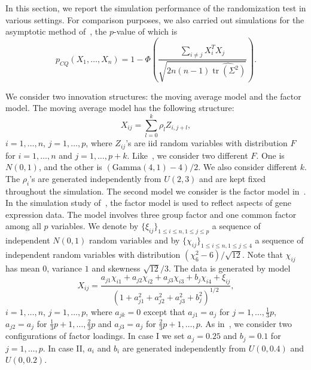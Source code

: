 \documentclass[3p]{elsarticle}
\DeclareMathOperator{\mytr}{tr}
\theoremstyle{plain}
\theoremstyle{definition}
\theoremstyle{remark}
\begin{document}
In this section, we report the simulation performance of the randomization test in various settings.
For comparison purposes, we also carried out simulations for the asymptotic method of~\citet{Chen2010A},
the $p$-value of which is
\begin{equation*}
p_{CQ}(X_1,\ldots,X_n)=1-\Phi\left(\frac{\sum_{i\neq j}X_i^T X_j}{\sqrt{2n(n-1)\widehat{\mytr(\Sigma^2)}}}\right).
\end{equation*}

We consider two innovation structures: the moving average model and the factor model.
The moving average model has the following structure:
    \begin{equation*}
    X_{ij}=\sum_{l=0}^k \rho_{l}Z_{i,j+l},
    \end{equation*}
$i=1,\ldots, n$, $j=1,\ldots, p$, where $Z_{ij}$'s are iid random variables with distribution $F$ for $i=1,\ldots, n$ and $j=1,\ldots, p+k$. 
Like~\citet{Chen2010A}, we consider two different $F$.
One is $N(0,1)$, and the other is $(\textrm{Gamma}(4,1)-4)/2$.
We also consider different $k$.
The $\rho_i$'s are generated independently from $U(2,3)$ and are kept fixed throughout the simulation.
The second model we consider is the factor model in~\citet{fan2007to}.
In the simulation study of~\citet{fan2007to}, the factor model is used to reflect aspects of gene expression data.
The model involves three group factor and one common factor among all $p$ variables. 
We denote by $\{\xi_{ij}\}_{1\leq i\leq n, 1\leq j\leq p}$ a sequence of independent $N(0,1)$ random variables and by $\{\chi_{ij}\}_{1\leq i \leq n, 1\leq j \leq 4}$ a sequence of independent random variables with distribution $(\chi_{6}^2-6)/\sqrt{12}$.
Note that $\chi_{ij}$ has mean $0$, variance $1$ and skewness $\sqrt{12}/3$.
The data is generated by model
\begin{equation*}
    X_{ij}=\frac{a_{j1}\chi_{i1}+a_{j2}\chi_{i2}+a_{j3}\chi_{i3}+b_{j}\chi_{i4}+\xi_{ij}}{{(1+a_{j1}^2+a_{j2}^2+a_{j3}^2+b_j^2)}^{1/2}},
\end{equation*}
$i=1,\ldots, n$, $j=1,\ldots, p$,
where $a_{jk}=0$ except that $a_{j1}=a_j$ for $j=1,\ldots,\frac{1}{3}p$, $a_{j2}=a_j$ for $\frac{1}{3}p+1,\ldots,\frac{2}{3}p$ and $a_{j3}=a_j$ for $\frac{2}{3}p+1,\ldots,p$.
As in~\citet{fan2007to}, we consider two configurations of factor loadings. In  case I we set $a_j=0.25$ and $b_j=0.1$ for $j=1,\ldots, p$. In case II, $a_i$ and $b_i$ are generated independently from $U(0,0.4)$ and $U(0,0.2)$.
\end{document}
